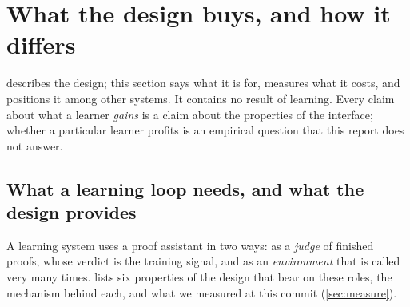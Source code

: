 \section{What the design buys, and how it differs}\label{sec:why}

 describes the design; this section says what it is for, measures what it costs, and positions it among other systems.
It contains no result of learning.
Every claim about what a learner \emph{gains} is a claim about the properties of the interface; whether a particular learner profits is an empirical question that this report does not answer.

\subsection{What a learning loop needs, and what the design provides}\label{sec:properties}

A learning system uses a proof assistant in two ways: as a \emph{judge} of finished proofs, whose verdict is the training signal, and as an \emph{environment} that is called very many times.
 lists six properties of the design that bear on these roles, the mechanism behind each, and what we measured at this commit (\cref{sec:measure}).

